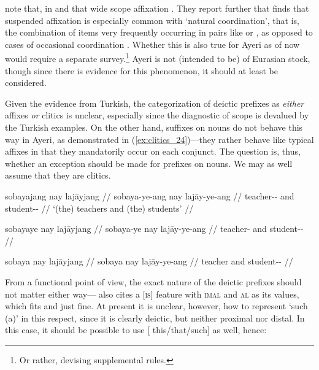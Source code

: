 \citet{spencerluis2012} note that, in  and that wide scope affixation . They report further that \citet{wälchli2005} finds
that suspended affixation is especially common with `natural coordination',
that is, the combination of items very frequently occurring in pairs like
 or , as opposed to cases of
occasional coordination \citep[200]{spencerluis2012}. Whether this is also true
for Ayeri as of now would require a separate survey.\footnote{Or rather,
devising supplemental rules.} Ayeri is not (intended to be) of Eurasian stock,
though since there is evidence for this phenomenon, it should at least be
considered.

Given the evidence from Turkish, the categorization of deictic prefixes as
\emph{either} affixes \emph{or} clitics is unclear, especially since the
diagnostic of scope is devalued by the Turkish examples. On the other hand,
suffixes on nouns do not behave this way in Ayeri, as demonstrated in
(\ref{ex:clitics_24})---they rather behave like typical affixes in that they
mandatorily occur on each conjunct. The question is, thus, whether an exception
should be made for prefixes on nouns. We may as well assume that they are
clitics.

\pex\label{ex:clitics_24}
\a\label{ex:clitics_24a}\begingl
	\gla sobayajang nay lajāyjang //
	\glb sobaya-ye-ang nay lajāy-ye-ang //
	\glc teacher-\Pl{}-\Aarg{} and student-\Pl{}-\Aarg{} //
	\glft `(the) teachers and (the) students' //
\endgl

\a\label{ex:clitics_24b}\ljudge{*}\begingl
	\gla sobayaye nay lajāyjang //
	\glb sobaya-ye nay lajāy-ye-ang //
	\glc teacher-\Pl{} and student-\Pl{}-\Aarg{} //
\endgl

\a\label{ex:clitics_24c}\ljudge{*}\begingl
	\gla sobaya nay lajāyjang //
	\glb sobaya nay lajāy-ye-ang //
	\glc teacher and student-\Pl{}-\Aarg{} //
\endgl
\xe

From a functional point of view, the exact nature of the deictic prefixes
should not matter either way---\citet[Feature Table]{pargram} also cites a
[\Deix{}\textsc{is}] feature with \Prox{}\textsc{imal} and \Dist{}\textsc{al}
as its values, which fits  and 
just fine. At present it is unclear, however, how to represent `such (a)' in
this respect, since it is clearly deictic, but neither  proximal nor distal. In
this case, it should be possible to use [\Deix{} this/that/such] as well,
hence:

